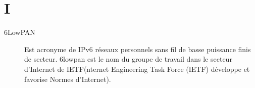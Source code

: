 \section{I}

\begin{description}

\item [6LowPAN]Est acronyme de IPv6 réseaux personnels sans fil de basse puissance finis de secteur. 6lowpan est le nom du groupe de travail dans le secteur d'Internet de IETF(nternet Engineering Task Force (IETF) développe et favorise Normes d'Internet).

\end{description}